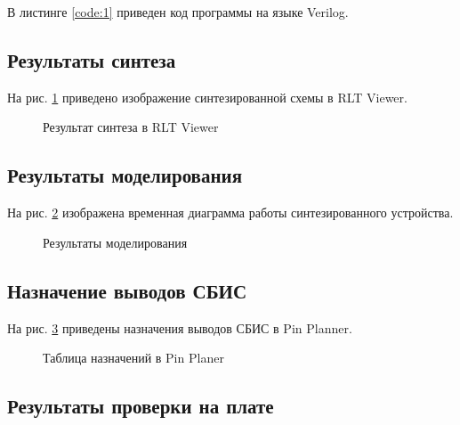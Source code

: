 В листинге \ref{code:1} приведен код программы на языке Verilog.

%

\subsection{Результаты синтеза}

На рис. \ref{fig:lab6_1_rtl} приведено изображение синтезированной схемы в RLT Viewer.

\begin{figure}[H]
\begin{center}
	\caption{Результат синтеза в RLT Viewer}
	\label{fig:lab6_1_rtl}
\end{center}
\end{figure}

\subsection{Результаты моделирования}
\label{sec:lab6_1_modeling}

На рис. \ref{fig:lab6_1_modeling} изображена временная диаграмма работы синтезированного устройства.
\vspace{-0.2cm}
\begin{figure}[H]
\begin{center}
	\caption{Результаты моделирования}
	\label{fig:lab6_1_modeling}
\end{center}
\end{figure}

\subsection{Назначение выводов СБИС}

На рис. \ref{fig:lab6_1_pins} приведены назначения выводов СБИС в Pin Planner.

\begin{figure}[H]
\begin{center}
	\caption{Таблица назначений в Pin Planer}
	\label{fig:lab6_1_pins}
\end{center}
\end{figure}

\subsection{Результаты проверки на плате}

